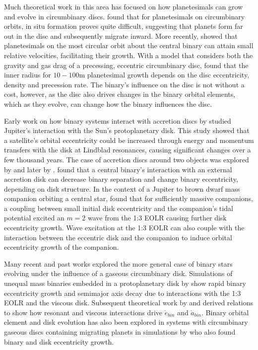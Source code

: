Much theoretical work in this area has focused on how planetesimals
can grow and evolve in circumbinary discs.  \citet{Paardekooper12}
found that for planetesimals on circumbinary orbits, in situ formation
proves quite difficult, suggesting that planets form far out in the
disc and subsequently migrate inward.  More recently, \citet{Bromley2015}
showed that planetesimals on the most circular orbit about the central
binary can attain small relative velocities, facilitating their growth.
With a model that considers both the gravity and gas drag of a
precessing, eccentric circumbinary disc, \citet{Silsbee15a} found that
the inner radius for $10-100$m planetesimal growth depends on the disc eccentricity, density and precession rate.  The binary's influence on the disc is not without a cost, however, as the disc also drives changes in the binary orbital elements, which as they evolve, can change how the binary influences the disc.

Early work on how binary systems interact with accretion discs by \citet{Goldreich1980} studied Jupiter's interaction with the Sun's protoplanetary disk.  This study showed that a satellite's orbital eccentricity could be increased through energy and momentum transfers with the disk at Lindblad resonances, causing significant changes over a few thousand years.  The case of accretion discs around two objects was explored by \citet{Pringle91} and later by \citet{Papaloizou01}.  \citet{Pringle91} found that a central binary's interaction with an external accretion disk can decrease binary separation and change binary eccentricity, depending on disk structure.  In the context of a Jupiter to brown dwarf mass companion orbiting a central star,  \citet{Papaloizou01} found that for sufficiently massive companions, a coupling between small initial disk eccentricity and the companion's
tidal potential excited an $m = 2$ wave from the 1:3 EOLR causing further disk eccentricity growth.  Wave excitation at the 1:3 EOLR can also couple with the interaction between the eccentric disk and the companion to induce orbital eccentricity growth of the companion.  

Many recent and past works explored the more general case of binary stars evolving under the influence of a gaseous circumbinary disk.  Simulations of unequal mass binaries embedded in a protoplanetary disk by \citet{Artymowicz1991} show rapid binary eccentricity growth and semimajor axis decay due to interactions with the 1:3 EOLR and the viscous disk.  Subsequent theoretical work by \citet{Arty96b} and \citet{Arty2000} derived relations to show how resonant and viscous interactions drive $\dot{e}_{bin}$ and $\dot{a}_{bin}$.  Binary orbital element and disk evolution has also been explored in systems with circumbinary gaseous discs containing migrating planets in simulations by \citet{PierensNelson07} who also found binary and disk eccentricity growth.

